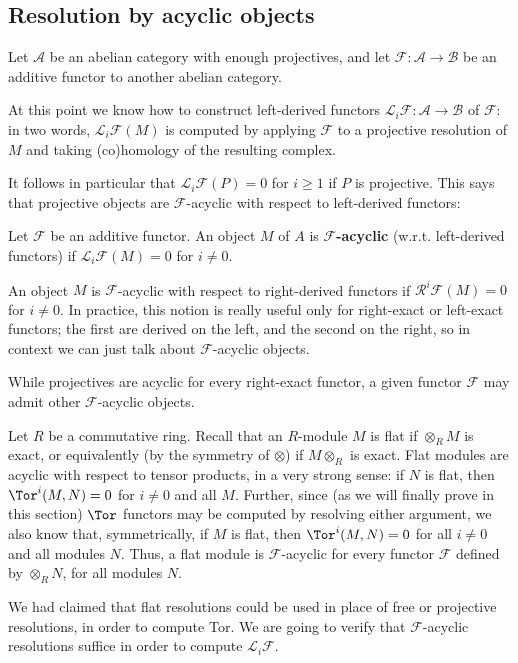\subsection{Resolution by acyclic objects}
Let $\mathcal{A}$ be an abelian category with enough projectives, and let $\mathscr{F}:\mathcal{A}\to\mathcal{B}$ be an additive functor to another abelian category.\par
At this point we know how to construct left-derived functors $\mathcal{L}_i\mathscr{F}:\mathcal{A}\to\mathcal{B}$ of $\mathscr{F}$: in two words, $\mathcal{L}_i\mathscr{F}(M)$ is computed by applying $\mathscr{F}$ to a projective resolution of $M$ and taking (co)homology of the resulting complex.\par
It follows in particular that $\mathcal{L}_i\mathscr{F}(P)=0$ for $i\geq 1$ if $P$ is projective. This says that projective objects are $\mathscr{F}$-acyclic with respect to left-derived functors:
\begin{definition}
Let $\mathscr{F}$ be an additive functor. An object $M$ of $A$ is \textbf{$\mathscr{F}$-acyclic} (w.r.t. left-derived functors) if $\mathcal{L}_i\mathscr{F}(M)=0$ for $i\neq0$.
\end{definition}
An object $M$ is $\mathscr{F}$-acyclic with respect to right-derived functors if $\mathcal{R}^i\mathscr{F}(M)=0$ for $i\neq0$. In practice, this notion is really useful only for right-exact or left-exact functors; the first are derived on the left, and the second on the right, so in context we can just talk about $\mathscr{F}$-acyclic objects.\par
While projectives are acyclic for every right-exact functor, a given functor $\mathscr{F}$ may admit other $\mathscr{F}$-acyclic objects.
\begin{example}
Let $R$ be a commutative ring. Recall that an $R$-module $M$ is flat if $\otimes_{R}M$ is exact, or equivalently (by the symmetry of $\otimes$) if $M\otimes_{R}$ is exact. Flat modules are acyclic with respect to tensor products, in a very strong sense: if $N$ is flat, then $\Tor^i(M,N)=0$ for $i\neq0$ and all $M$. Further, since (as we will finally prove in this section) $\Tor$ functors may be computed by resolving either argument, we also know that, symmetrically, if $M$ is flat, then $\Tor^i(M,N)=0$ for all $i\neq0$ and all modules $N$. Thus, a flat module is $\mathscr{F}$-acyclic for every functor $\mathscr{F}$ defined by $\otimes_{R}N$, for all modules $N$.
\end{example}
We had claimed that flat resolutions could be used in place of free or projective resolutions, in order to compute Tor. We are going to verify that $\mathscr{F}$-acyclic resolutions suffice in order to compute $\mathcal{L}_i\mathscr{F}$.
